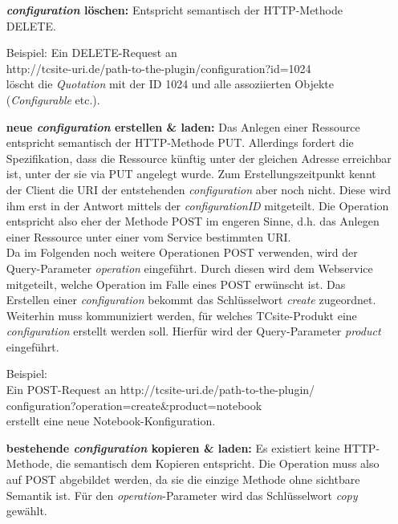\documentclass[11pt, a4paper, titlepage, listof=totoc, bibliography=totoc, index=totoc, twoside, openright, headings=normal]{scrreprt}
\begin{document}
\begin{enumerate}
\item[\textbf{\emph{configuration} löschen:}] Entspricht semantisch der HTTP-Methode DELETE.
\begin{addmargin}[25pt]{0pt} 
Beispiel: Ein DELETE-Request an\\
\glqq http://tcsite-uri.de/path-to-the-plugin/configuration?id=1024\grqq{}
\\löscht die \emph{Quotation} mit der ID 1024 und alle assoziierten Objekte (\emph{Configurable} etc.).
\end{addmargin}
\item[\textbf{neue \emph{configuration} erstellen \& laden:}] Das Anlegen einer Ressource entspricht semantisch der HTTP-Methode PUT. Allerdings fordert die Spezifikation, dass die Ressource künftig unter der gleichen Adresse erreichbar ist, unter der sie via PUT angelegt wurde. Zum Erstellungszeitpunkt kennt der Client die URI der entstehenden \emph{configuration} aber noch nicht. Diese wird ihm erst in der Antwort mittels der \emph{configurationID} mitgeteilt. Die Operation entspricht also eher der Methode POST im engeren Sinne, d.h. das Anlegen einer Ressource unter einer vom Service bestimmten URI.\\Da im Folgenden noch weitere Operationen POST verwenden, wird der Query-Parameter \emph{operation} eingeführt. Durch diesen wird dem Webservice mitgeteilt, welche Operation im Falle eines POST erwünscht ist. Das Erstellen einer \emph{configuration} bekommt das Schlüsselwort \emph{create} zugeordnet. Weiterhin muss kommuniziert werden, für welches TCsite-Produkt eine \emph{configuration} erstellt werden soll. Hierfür wird der Query-Parameter \emph{product} eingeführt.
\begin{addmargin}[25pt]{0pt} 
Beispiel:
\\Ein POST-Request an \glqq http://tcsite-uri.de/path-to-the-plugin/
\\configuration?operation=create\&product=notebook\grqq{}\\
erstellt eine neue Notebook-Konfiguration.
\end{addmargin}
\item[\textbf{bestehende \emph{configuration} kopieren \& laden:}] Es existiert keine HTTP-Methode, die semantisch dem Kopieren entspricht. Die Operation muss also auf POST abgebildet werden, da sie die einzige Methode ohne sichtbare Semantik ist. Für den \emph{operation}-Parameter wird das Schlüsselwort \emph{copy} gewählt.
\begin{addmargin}[25pt]{0pt} 

\end{addmargin}
\end{enumerate}
\end{document}
